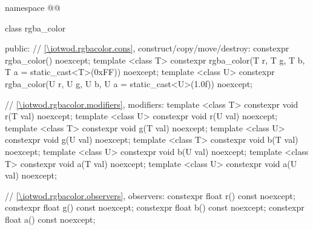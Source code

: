 \begin{codeblock}
namespace @\fullnamespace{}@ {
  class rgba_color {
  public:
    // \ref{\iotwod.rgbacolor.cons}, construct/copy/move/destroy:
    constexpr rgba_color() noexcept;
    template <class T>
    constexpr rgba_color(T r, T g, T b, T a = static_cast<T>(0xFF)) noexcept;
    template <class U>
    constexpr rgba_color(U r, U g, U b, U a = static_cast<U>(1.0f)) noexcept;
  
    // \ref{\iotwod.rgbacolor.modifiers}, modifiers:
    template <class T>
    constexpr void r(T val) noexcept;
    template <class U>
    constexpr void r(U val) noexcept;
    template <class T>
    constexpr void g(T val) noexcept;
    template <class U>
    constexpr void g(U val) noexcept;
    template <class T>
    constexpr void b(T val) noexcept;
    template <class U>
    constexpr void b(U val) noexcept;
    template <class T>
    constexpr void a(T val) noexcept;
    template <class U>
    constexpr void a(U val) noexcept;
    
    // \ref{\iotwod.rgbacolor.observers}, observers:
    constexpr float r() const noexcept;
    constexpr float g() const noexcept;
    constexpr float b() const noexcept;
    constexpr float a() const noexcept;
    
}}
\end{codeblock}
